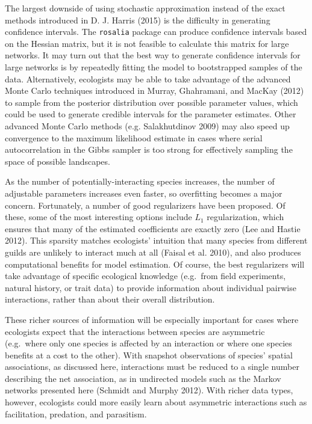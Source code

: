 The largest downside of using stochastic approximation instead of the
exact methods introduced in D. J. Harris (2015) is the difficulty in
generating confidence intervals. The \texttt{rosalia} package can
produce confidence intervals based on the Hessian matrix, but it is not
feasible to calculate this matrix for large networks. It may turn out
that the best way to generate confidence intervals for large networks is
by repeatedly fitting the model to bootstrapped samples of the data.
Alternatively, ecologists may be able to take advantage of the advanced
Monte Carlo techniques introduced in Murray, Ghahramani, and MacKay
(2012) to sample from the posterior distribution over possible parameter
values, which could be used to generate credible intervals for the
parameter estimates. Other advanced Monte Carlo methods (e.g.
Salakhutdinov 2009) may also speed up convergence to the maximum
likelihood estimate in cases where serial autocorrelation in the Gibbs
sampler is too strong for effectively sampling the space of possible
landscapes.

As the number of potentially-interacting species increases, the number
of adjustable parameters increases even faster, so overfitting becomes a
major concern. Fortunately, a number of good regularizers have been
proposed. Of these, some of the most interesting options include \(L_1\)
regularization, which ensures that many of the estimated coefficients
are exactly zero (Lee and Hastie 2012). This sparsity matches
ecologists' intuition that many species from different guilds are
unlikely to interact much at all (Faisal et al. 2010), and also produces
computational benefits for model estimation. Of course, the best
regularizers will take advantage of specific ecological knowledge
(e.g.~from field experiments, natural history, or trait data) to provide
information about individual pairwise interactions, rather than about
their overall distribution.

These richer sources of information will be especially important for
cases where ecologists expect that the interactions between species are
asymmetric (e.g.~where only one species is affected by an interaction or
where one species benefits at a cost to the other). With snapshot
observations of species' spatial associations, as discussed here,
interactions must be reduced to a single number describing the net
association, as in undirected models such as the Markov networks
presented here (Schmidt and Murphy 2012). With richer data types,
however, ecologists could more easily learn about asymmetric
interactions such as facilitation, predation, and parasitism.

